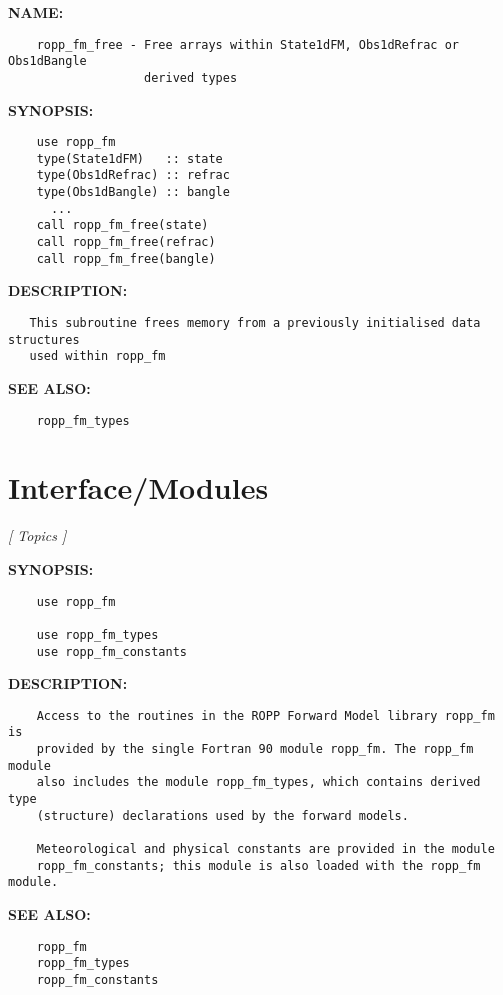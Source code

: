 \label{ch:robo47}
\label{ch:ForwardModels_ropp_fm_free}
\textbf{NAME:}\hspace{0.08in}\begin{Verbatim}
    ropp_fm_free - Free arrays within State1dFM, Obs1dRefrac or Obs1dBangle
                   derived types
\end{Verbatim}
\textbf{SYNOPSIS:}\hspace{0.08in}\begin{Verbatim}
    use ropp_fm
    type(State1dFM)   :: state
    type(Obs1dRefrac) :: refrac
    type(Obs1dBangle) :: bangle
      ...
    call ropp_fm_free(state)
    call ropp_fm_free(refrac)
    call ropp_fm_free(bangle)
\end{Verbatim}
\textbf{DESCRIPTION:}\hspace{0.08in}\begin{Verbatim}
   This subroutine frees memory from a previously initialised data structures
   used within ropp_fm
\end{Verbatim}
\textbf{SEE ALSO:}\hspace{0.08in}\begin{Verbatim}
    ropp_fm_types
\end{Verbatim}
\section{Interface/Modules}
\textsl{[ Topics ]}

\label{ch:robo48}
\label{ch:Interface_Modules}
\textbf{SYNOPSIS:}\hspace{0.08in}\begin{Verbatim}
    use ropp_fm

    use ropp_fm_types
    use ropp_fm_constants
\end{Verbatim}
\textbf{DESCRIPTION:}\hspace{0.08in}\begin{Verbatim}
    Access to the routines in the ROPP Forward Model library ropp_fm is
    provided by the single Fortran 90 module ropp_fm. The ropp_fm module
    also includes the module ropp_fm_types, which contains derived type
    (structure) declarations used by the forward models.

    Meteorological and physical constants are provided in the module
    ropp_fm_constants; this module is also loaded with the ropp_fm module.
\end{Verbatim}
\textbf{SEE ALSO:}\hspace{0.08in}\begin{Verbatim}
    ropp_fm
    ropp_fm_types
    ropp_fm_constants
\end{Verbatim}
